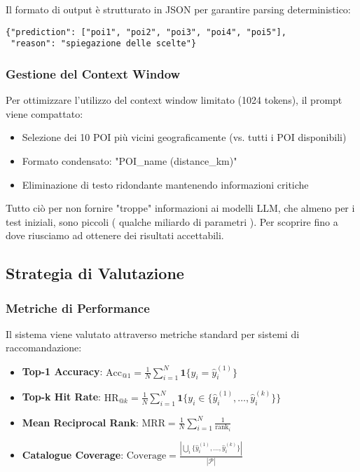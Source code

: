 Il formato di output è strutturato in JSON per garantire parsing deterministico:
\begin{verbatim}
{"prediction": ["poi1", "poi2", "poi3", "poi4", "poi5"], 
 "reason": "spiegazione delle scelte"}
\end{verbatim}

\subsubsection{Gestione del Context Window}

Per ottimizzare l'utilizzo del context window limitato (1024 tokens), il prompt viene compattato:
\begin{itemize}
\item Selezione dei 10 POI più vicini geograficamente (vs. tutti i POI disponibili)
\item Formato condensato: "POI\_name (distance\_km)"
\item Eliminazione di testo ridondante mantenendo informazioni critiche
\end{itemize}

Tutto ciò per non fornire "troppe" informazioni ai modelli LLM, che almeno per i test iniziali, sono piccoli ( qualche miliardo di parametri ). Per scoprire fino a dove riusciamo ad ottenere dei risultati accettabili. 

\subsection{Strategia di Valutazione}

\subsubsection{Metriche di Performance}

Il sistema viene valutato attraverso metriche standard per sistemi di raccomandazione:

\begin{itemize}
\item \textbf{Top-1 Accuracy}: $\text{Acc}_{@1}=\frac{1}{N}\sum_{i=1}^{N}\mathbf{1}\{y_i=\hat{y}_i^{(1)}\}$
\item \textbf{Top-k Hit Rate}: $\text{HR}_{@k}=\frac{1}{N}\sum_{i=1}^{N}\mathbf{1}\{y_i\in\{\hat{y}_i^{(1)},\dots,\hat{y}_i^{(k)}\}\}$
\item \textbf{Mean Reciprocal Rank}: $\text{MRR}=\frac{1}{N}\sum_{i=1}^{N}\frac{1}{\operatorname{rank}_i}$
\item \textbf{Catalogue Coverage}: $\text{Coverage}=\frac{|\bigcup_{i}\{\hat{y}_i^{(1)},\dots,\hat{y}_i^{(k)}\}|}{|\mathcal{P}|}$
\end{itemize}

